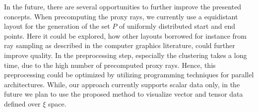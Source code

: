 \documentclass[review,journal]{vgtc}         %
\begin{document}
In the future, there are several opportunities to further improve the presented concepts. When precomputing the proxy rays, we currently use a equidistant layout for the generation of the set $P$ of uniformly distributed start and end points. Here it could be explored, how other layouts borrowed for instance from ray sampling as described in the computer graphics literature, could further improve quality. In the preprocessing step, especially the clustering takes a long time, due to the high number of precomputed proxy rays. Hence, this preprocessing could be optimized by utilizing programming techniques for parallel architectures. While, our approach currently supports scalar data only, in the future we plan to use the proposed method to visualize vector and tensor data defined over $\xi$ space.




\end{document}
